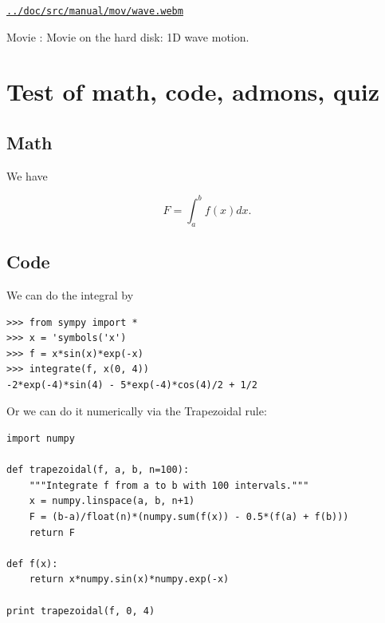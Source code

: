 \documentclass[%
twoside,                 %
final,                   %
10pt]{article}
\newenvironment{doconce:movie}{}{}
\newcounter{doconce:movie:counter}
\begin{document}
\begin{doconce:movie}
\begin{center}
\href{run:../doc/src/manual/mov/wave.webm}{\nolinkurl{../doc/src/manual/mov/wave.webm}}
\end{center}

\begin{center}  %
Movie : Movie on the hard disk: 1D wave motion.
\end{center}
\end{doconce:movie}


\section{Test of math, code, admons, quiz}

\subsection{Math}

We have

\begin{equation}
F = \int_a^b f(x)dx.
\end{equation}

\subsection{Code}

We can do the integral by

\begin{Verbatim}[numbers=none,fontsize=\fontsize{9pt}{9pt},baselinestretch=0.95,xleftmargin=2mm]
>>> from sympy import *
>>> x = 'symbols('x')
>>> f = x*sin(x)*exp(-x)
>>> integrate(f, x(0, 4))
-2*exp(-4)*sin(4) - 5*exp(-4)*cos(4)/2 + 1/2
\end{Verbatim}

Or we can do it numerically via the Trapezoidal rule:

\begin{Verbatim}[numbers=none,fontsize=\fontsize{9pt}{9pt},baselinestretch=0.95,xleftmargin=2mm]
import numpy

def trapezoidal(f, a, b, n=100):
    """Integrate f from a to b with 100 intervals."""
    x = numpy.linspace(a, b, n+1)
    F = (b-a)/float(n)*(numpy.sum(f(x)) - 0.5*(f(a) + f(b)))
    return F

def f(x):
    return x*numpy.sin(x)*numpy.exp(-x)

print trapezoidal(f, 0, 4)
\end{Verbatim}
\end{document}
